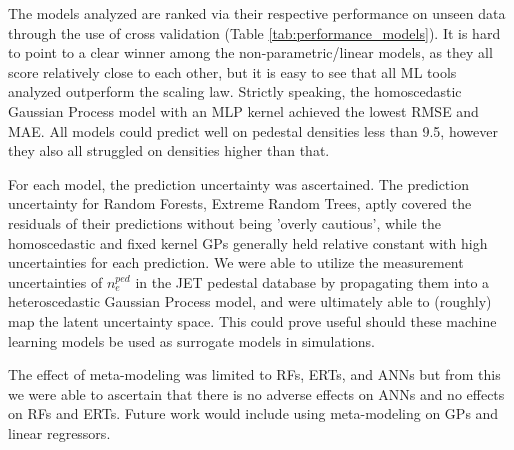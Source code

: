 \documentclass[a4paper, twoside, final, 12pt]{article}
\begin{document}
{The models analyzed are ranked via their respective performance on unseen data through the use of cross validation (Table \ref{tab:performance_models}).
It is hard to point to a clear winner among the non-parametric/linear models, as they all score relatively close to each other, but it is easy to see that all ML tools analyzed outperform the scaling law. Strictly speaking, the homoscedastic Gaussian Process model with an MLP kernel achieved the lowest RMSE and MAE. All models could predict well on pedestal densities less than 9.5, however they also all struggled on densities higher than that.

For each model, the prediction uncertainty was ascertained. The prediction uncertainty for Random Forests, Extreme Random Trees, aptly covered the residuals of their predictions without being 'overly cautious', while the homoscedastic and fixed kernel GPs generally held relative constant with high uncertainties for each prediction. We were able to utilize the measurement uncertainties of $n_e^{ped}$ in the JET pedestal database by propagating them into a heteroscedastic Gaussian Process model, and were ultimately able to (roughly) map the latent uncertainty space. This could prove useful should these machine learning models be used as surrogate models in simulations.

The effect of meta-modeling was limited to RFs, ERTs, and ANNs but from this we were able to ascertain that there is no adverse effects on ANNs and no effects on RFs and ERTs. Future work would include using meta-modeling on GPs and linear regressors. 



}
\end{document}
